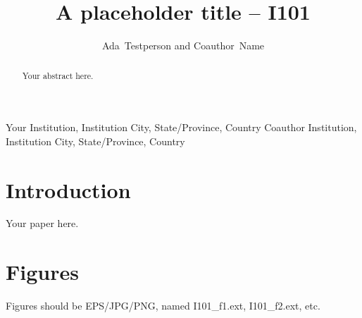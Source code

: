 \documentclass[11pt,twoside]{article}
\begin{document}
\title{A placeholder title -- I101}

\author{Ada~Testperson and Coauthor~Name}
Your Institution, Institution City, State/Province, Country
Coauthor Institution, Institution City, State/Province, Country



\begin{abstract}
Your abstract here.
\end{abstract}

\section{Introduction}

Your paper here.

\section{Figures}

Figures should be EPS/JPG/PNG, named I101\_f1.ext, I101\_f2.ext, etc.

% 
\end{document}
